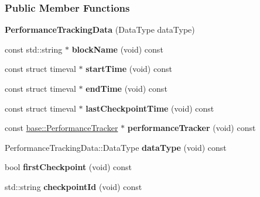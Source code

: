 \subsubsection*{Public Member Functions}
\begin{DoxyCompactItemize}
\item 
\hypertarget{a00067_afea4cb5328e6fdb27fcf8fc14acbdb40}{}{\bfseries Performance\+Tracking\+Data} (Data\+Type data\+Type)\label{a00067_afea4cb5328e6fdb27fcf8fc14acbdb40}

\item 
\hypertarget{a00067_a929601137dcef83759a563a94ef7aad4}{}const std\+::string $\ast$ {\bfseries block\+Name} (void) const \label{a00067_a929601137dcef83759a563a94ef7aad4}

\item 
\hypertarget{a00067_aeb2462e8a5c9e43a874a5bd441f22a17}{}const struct timeval $\ast$ {\bfseries start\+Time} (void) const \label{a00067_aeb2462e8a5c9e43a874a5bd441f22a17}

\item 
\hypertarget{a00067_a1828f5f7c3c1d879b73bb090df87dfb8}{}const struct timeval $\ast$ {\bfseries end\+Time} (void) const \label{a00067_a1828f5f7c3c1d879b73bb090df87dfb8}

\item 
\hypertarget{a00067_af6f072db1ae54343864bc19c2f99c186}{}const struct timeval $\ast$ {\bfseries last\+Checkpoint\+Time} (void) const \label{a00067_af6f072db1ae54343864bc19c2f99c186}

\item 
\hypertarget{a00067_ad19493aa3f826fdee28b59630ba3ecae}{}const \hyperlink{a00065}{base\+::\+Performance\+Tracker} $\ast$ {\bfseries performance\+Tracker} (void) const \label{a00067_ad19493aa3f826fdee28b59630ba3ecae}

\item 
\hypertarget{a00067_a38dc15a2015be16e23aafd3c36332dbf}{}Performance\+Tracking\+Data\+::\+Data\+Type {\bfseries data\+Type} (void) const \label{a00067_a38dc15a2015be16e23aafd3c36332dbf}

\item 
\hypertarget{a00067_a5bf01d3c580627a9a564cc6043275287}{}bool {\bfseries first\+Checkpoint} (void) const \label{a00067_a5bf01d3c580627a9a564cc6043275287}

\item 
\hypertarget{a00067_a17c92b7a9ea243eb37f3fa903ce6e06d}{}std\+::string {\bfseries checkpoint\+Id} (void) const \label{a00067_a17c92b7a9ea243eb37f3fa903ce6e06d}


\end{DoxyCompactItemize}

